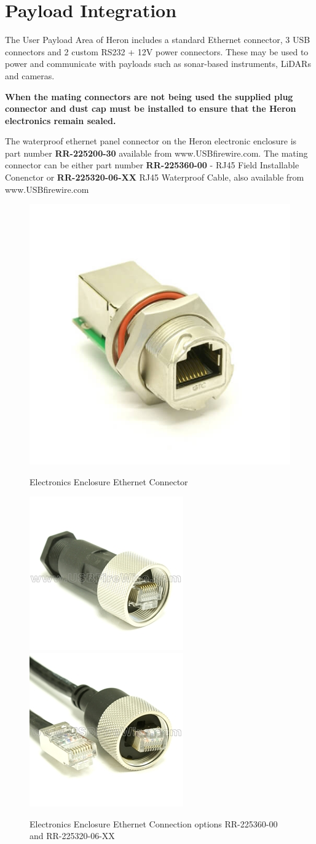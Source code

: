 \documentclass[]{clearpath-latex/clearpath-manual}
\begin{document}
\newpage

\section{Payload Integration}
The User Payload Area of Heron includes a standard Ethernet connector, 3 USB connectors and 2 custom RS232 + 12V power connectors. These may be used to power and communicate with payloads such as sonar-based instruments, LiDARs and cameras.

\textbf{When the mating connectors are not being used the supplied plug connector and dust cap must be installed to ensure that the Heron electronics remain sealed.}

The waterproof ethernet panel connector on the Heron electronic enclosure is part number \textbf{RR-225200-30} available from www.USBfirewire.com. The mating connector can be either part number \textbf{RR-225360-00} - RJ45 Field Installable Conenctor or \textbf{RR-225320-06-XX} RJ45 Waterproof Cable, also available from www.USBfirewire.com



\begin{figure}[h]
  \centering
  \includegraphics[width=0.25\linewidth]{graphics/RR-225200-30.jpg}
  \label{h_eth0}
  \caption{Electronics Enclosure Ethernet Connector}
\end{figure}

\begin{figure}[h]
  \centering
  \includegraphics[width=0.25\linewidth]{graphics/RR-225360-00.jpg}
  \includegraphics[width=0.25\linewidth]{graphics/RR-225320-06-118.jpg}

  \label{h_eth1}
  \caption{Electronics Enclosure Ethernet Connection options RR-225360-00 and RR-225320-06-XX}
\end{figure}
\end{document}
